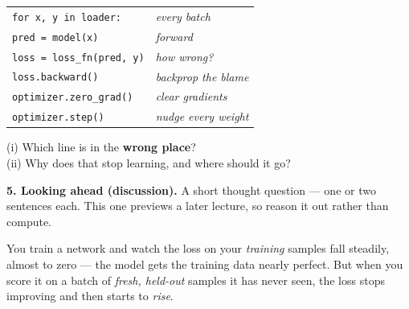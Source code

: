\documentclass[11pt]{article}
\newif\ifsolution
\newcommand{\blk}[1]{\underline{\hspace{#1}}}
\newcommand{\rb}[2]{\ifsolution\textbf{#1}\else\blk{#2}\fi}
\newcommand{\keybox}[1]{\ifsolution\par\vspace{2pt}%
  \fbox{\parbox{0.965\textwidth}{\small\textbf{Answer.}\; #1}}\par\fi}
\newcommand{\work}[1]{\ifsolution\else\vspace{#1}\fi}
\begin{document}
\vspace{4pt}
\begin{center}
\begin{tabular}{@{}l@{\qquad}p{}@{}}
\texttt{for x, y in loader:}        & {\small\itshape every batch} \\[4pt]
\hspace{1em}\texttt{pred = model(x)}         & {\small\itshape forward} \\[4pt]
\hspace{1em}\texttt{loss = loss\_fn(pred, y)} & {\small\itshape how wrong?} \\[4pt]
\hspace{1em}\texttt{loss.backward()}          & {\small\itshape backprop the blame} \\[4pt]
\hspace{1em}\texttt{optimizer.zero\_grad()}   & {\small\itshape clear gradients} \\[4pt]
\hspace{1em}\texttt{optimizer.step()}         & {\small\itshape nudge every weight} \\
\end{tabular}
\end{center}

{\small (i) Which line is in the \textbf{wrong place}?}\; \rb{\texttt{optimizer.zero\_grad()}}{6cm}\\[4pt]
{\small (ii) Why does that stop learning, and where should it go?}

\work{0.5cm}

\keybox{(i) \texttt{optimizer.zero\_grad()} is misplaced --- it runs \emph{after}
\texttt{loss.backward()}. (ii) \texttt{backward()} computes this batch's gradients and stores them in
each weight's \texttt{.grad}; \texttt{zero\_grad()} then immediately \textbf{erases} them, so
\texttt{optimizer.step()} applies all-zero gradients and no weight moves --- the loss stays flat
forever. Move \texttt{zero\_grad()} to \emph{before} \texttt{backward()} (correct order:
\texttt{zero\_grad} $\rightarrow$ \texttt{backward} $\rightarrow$ \texttt{step}). Gradients live in
\texttt{.grad} and must be cleared just \emph{before}, never just after, the backward sweep.}

\textbf{5. Looking ahead (discussion).}\; {\small A short thought question --- one or two sentences
each. This one previews a later lecture, so reason it out rather than compute.}

\vspace{3pt}
You train a network and watch the loss on your \emph{training} samples fall steadily, almost to
zero --- the model gets the training data nearly perfect. But when you score it on a batch of
\emph{fresh, held-out} samples it has never seen, the loss stops improving and then starts to
\emph{rise}.
\end{document}
